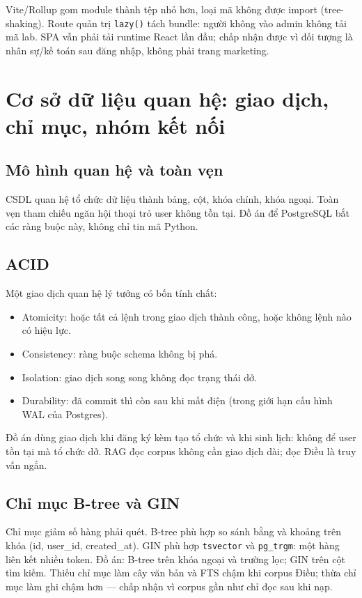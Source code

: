 Vite/Rollup gom module thành tệp nhỏ hơn, loại mã không được import
(tree-shaking). Route quản trị \texttt{lazy()} tách bundle: người không vào
admin không tải mã lab. SPA vẫn phải tải runtime React lần đầu; chấp nhận được
vì đối tượng là nhân sự/kế toán sau đăng nhập, không phải trang marketing.

\section{Cơ sở dữ liệu quan hệ: giao dịch, chỉ mục, nhóm kết nối}

\subsection{Mô hình quan hệ và toàn vẹn}

CSDL quan hệ tổ chức dữ liệu thành bảng, cột, khóa chính, khóa ngoại. Toàn vẹn
tham chiếu ngăn hội thoại trỏ user không tồn tại. Đồ án để PostgreSQL bắt các
ràng buộc này, không chỉ tin mã Python.

\subsection{ACID}

Một giao dịch quan hệ lý tưởng có bốn tính chất:

\begin{itemize}
    \item Atomicity: hoặc tất cả lệnh trong giao dịch thành công, hoặc không
    lệnh nào có hiệu lực.
    \item Consistency: ràng buộc schema không bị phá.
    \item Isolation: giao dịch song song không đọc trạng thái dở.
    \item Durability: đã commit thì còn sau khi mất điện (trong giới hạn cấu
    hình WAL của Postgres).
\end{itemize}

Đồ án dùng giao dịch khi đăng ký kèm tạo tổ chức và khi sinh lịch: không để user
tồn tại mà tổ chức dở. RAG đọc corpus không cần giao dịch dài; đọc Điều là truy
vấn ngắn.

\subsection{Chỉ mục B-tree và GIN}

Chỉ mục giảm số hàng phải quét. B-tree phù hợp so sánh bằng và khoảng trên khóa
(id, user\_id, created\_at). GIN phù hợp \texttt{tsvector} và \texttt{pg\_trgm}:
một hàng liên kết nhiều token. Đồ án: B-tree trên khóa ngoại và trường lọc; GIN
trên cột tìm kiếm. Thiếu chỉ mục làm cây văn bản và FTS chậm khi corpus
\soDieu{} Điều; thừa chỉ mục làm ghi chậm hơn --- chấp nhận vì corpus gần như
chỉ đọc sau khi nạp.

